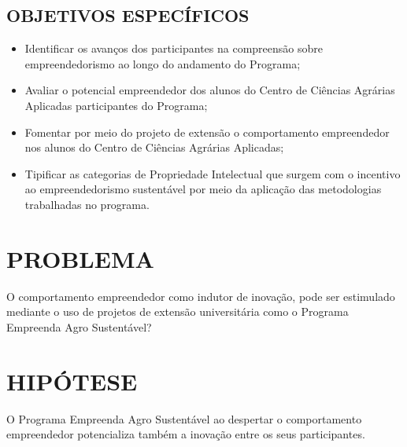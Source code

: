 \subsection{OBJETIVOS ESPECÍFICOS}

\begin{itemize}
\item{Identificar os avanços dos participantes na compreensão sobre empreendedorismo ao longo do andamento do Programa;}
\item {Avaliar o potencial empreendedor dos alunos do Centro de Ciências Agrárias Aplicadas participantes do Programa;}
\item {Fomentar por meio do projeto de extensão o comportamento empreendedor nos alunos do Centro de Ciências Agrárias Aplicadas;}
\item {Tipificar as categorias de Propriedade Intelectual que surgem com o incentivo ao empreendedorismo sustentável por meio da aplicação das metodologias trabalhadas no programa.}
\end{itemize}


\section{PROBLEMA}

O comportamento empreendedor como indutor de inovação, pode ser estimulado mediante o uso de projetos de extensão universitária como o Programa Empreenda Agro Sustentável? 


\section{HIPÓTESE}

O Programa Empreenda Agro Sustentável ao despertar o comportamento empreendedor potencializa também a inovação entre os seus participantes.



